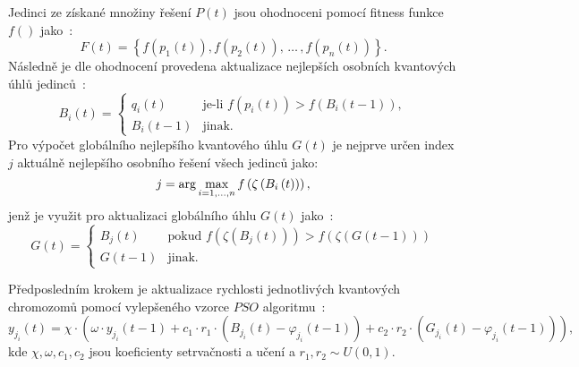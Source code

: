 Jedinci ze získané množiny řešení $P\left(t\right)$ jsou ohodnoceni pomocí fitness funkce $f\left(\right)$ jako~\cite{qse}: 
\begin{equation*}
    F\left(t\right) = \left\{ f\left(p_1\left(t\right)\right), f\left(p_2\left(t\right)\right), \,\dots\,, f\left(p_n\left(t\right)\right) \right\}.
\end{equation*}
Následně je dle ohodnocení provedena aktualizace nejlepších osobních kvantových úhlů jedinců~\cite{qse}:
\begin{equation}\label{eq:pers-best}
    B_i\left(t\right) =
    \begin{cases}
        q_i\left(t\right)   & \text{je-li } f\left(p_i\left(t\right)\right) > f\left(B_i\left(t-1\right)\right), \\
        B_i\left(t-1\right) & \text{jinak.}
    \end{cases}
\end{equation}
Pro výpočet globálního nejlepšího kvantového úhlu $G\left(t\right)$ je nejprve určen index $j$ aktuálně nejlepšího osobního řešení všech jedinců jako:
\begin{equation*}
    j = \arg\max_{i=1,\dots,n} f\left(\zeta\left(B_i\left(t\right)\right)\right),\\[5pt]
\end{equation*}
jenž je využit pro aktualizaci globálního úhlu $G\left(t\right)$ jako~\cite{qse}:
\begin{equation}\label{eq:glob-best}
    G\left(t\right) =
    \begin{cases}
        B_j\left(t\right)   & \text{pokud } f\left(\zeta\left(B_j\left(t\right)\right)\right) > f\left(\zeta\left(G\left(t-1\right)\right)\right) \\
        G\left(t-1\right)   & \text{jinak.}
    \end{cases}
\end{equation}

Předposledním krokem je aktualizace rychlosti jednotlivých kvantových chromozomů pomocí vylepšeného vzorce $PSO$ algoritmu~\cite{qse}: 
\begin{equation}\label{eq:qse-velocity}
    y_{j_i}\left(t\right) = \chi \cdot
    \left( \omega \cdot y_{j_i}\left(t-1\right) 
        + c_1 \cdot r_1 \cdot \left(B_{j_i}\left(t\right) - \varphi_{j_i}\left(t-1\right) \right)
        + c_2 \cdot r_2 \cdot \left( G_{j_i}\left(t\right) - \varphi_{j_i}\left(t-1\right) \right)\right),
\end{equation}
kde $\chi, \omega, c_1 , c_2$ jsou koeficienty setrvačnosti a učení a $r_1,r_2\sim U\left(0,1\right)$.  

